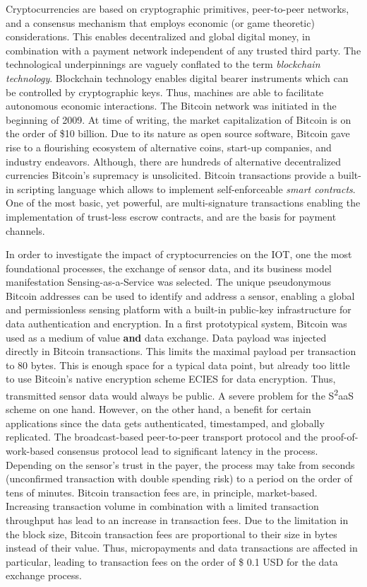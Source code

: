 Cryptocurrencies are based on cryptographic primitives, peer-to-peer networks, and a consensus mechanism that employs economic (or game theoretic) considerations. This enables decentralized and global digital money, in combination with a payment network independent of any trusted third party. The technological underpinnings are vaguely conflated to the term \emph{blockchain technology}. Blockchain technology enables digital bearer instruments which can be controlled by cryptographic keys. Thus, machines are able to facilitate autonomous economic interactions. 
The Bitcoin network was initiated in the beginning of 2009. At time of writing, the market capitalization of Bitcoin is on the order of \$10 billion. Due to its nature as open source software, Bitcoin gave rise to a flourishing ecosystem of alternative coins, start-up companies, and industry endeavors. Although, there are hundreds of alternative decentralized currencies Bitcoin's supremacy is unsolicited. Bitcoin transactions provide a built-in scripting language which allows to implement self-enforceable \emph{smart contracts}. One of the most basic, yet powerful, are multi-signature transactions enabling the implementation of trust-less escrow contracts, and are the basis for payment channels.

In order to investigate the impact of cryptocurrencies on the \ac{IOT}, one the most foundational processes, the exchange of sensor data, and its business model manifestation Sensing-as-a-Service was selected. The unique pseudonymous Bitcoin addresses can be used to identify and address a sensor, enabling a global and permissionless sensing platform with a built-in public-key infrastructure for data authentication and encryption. In a first prototypical system, Bitcoin was used as a medium of value \textbf{and} data exchange. Data payload was injected directly in Bitcoin transactions. This limits the maximal payload per transaction to 80 bytes. This is enough space for a typical data point, but already too little to use Bitcoin's native encryption scheme \ac{ECIES} for data encryption. Thus, transmitted sensor data would always be public. A severe problem for the S\textsuperscript{2}aaS scheme on one hand. However, on the other hand, a benefit for certain applications since the data gets authenticated, timestamped, and globally replicated. The broadcast-based peer-to-peer transport protocol and the proof-of-work-based consensus protocol lead to significant latency in the process. Depending on the sensor's trust in the payer, the process may take from seconds (unconfirmed transaction with double spending risk) to a period on the order of tens of minutes. Bitcoin transaction fees are, in principle, market-based. Increasing transaction volume in combination with a limited transaction throughput has lead to an increase in transaction fees. Due to the limitation in the block size, Bitcoin transaction fees are proportional to their size in bytes instead of their value. Thus, micropayments and data transactions are affected in particular, leading to transaction fees on the order of \$ 0.1 USD for the data exchange process. 

